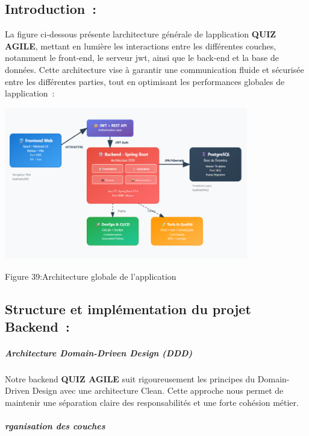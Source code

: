 \documentclass[12pt,a4paper,twoside]{report}
\begin{document}
\hypertarget{introduction}{%
\subsection{Introduction~:}\label{introduction}}

La figure ci-dessous présente l\textquotesingle architecture générale de
l\textquotesingle application \textbf{QUIZ AGILE}, mettant en lumière
les interactions entre les différentes couches, notamment le front-end,
le serveur jwt, ainsi que le back-end et la base de données. Cette
architecture vise à garantir une communication fluide et sécurisée entre
les différentes parties, tout en optimisant les performances globales de
l\textquotesingle application~:

\includegraphics[width=4.19167in,height=2.61667in]{latex_media/media/image45.png}

\protect\hypertarget{_Toc203823449}{}{}Figure 39:Architecture globale de
l'application

\hypertarget{structure-et-impluxe9mentation-du-projet-backend}{%
\subsection{Structure et implémentation du projet
Backend~:}\label{structure-et-impluxe9mentation-du-projet-backend}}

\hypertarget{architecture-domain-driven-design-ddd}{%
\subparagraph{Architecture Domain-Driven Design
(DDD)}\label{architecture-domain-driven-design-ddd}}

Notre backend \textbf{QUIZ AGILE} suit rigoureusement les principes du
Domain-Driven Design avec une architecture Clean. Cette approche nous
permet de maintenir une séparation claire des responsabilités et une
forte cohésion métier.

\hypertarget{rganisation-des-couches}{%
\subparagraph{rganisation des couches}\label{rganisation-des-couches}}
\end{document}
